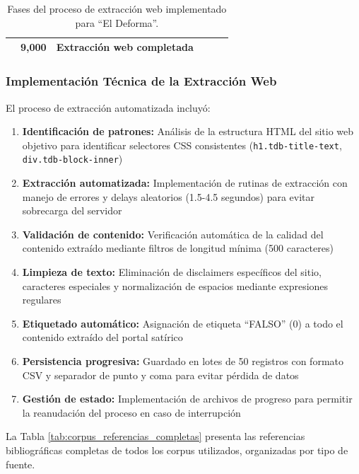 \begin{table}[htbp]
{\begin{tabular}{|c|l|l|c|c|l|}
\hline
\rowcolor{UAMAzcapo!20}
\multicolumn{4}{|c|}{\textbf{TOTAL EXTRAÍDO}} & \textbf{9,000} & \textbf{Extracción web completada} \\
\hline
\end{tabular}
}
\caption{Fases del proceso de extracción web implementado para ``El Deforma''.}
\label{tab:web_scraping_proceso}
\end{table}

\subsubsection{Implementación Técnica de la Extracción Web}

El proceso de extracción automatizada incluyó:

\begin{enumerate}
    \item \textbf{Identificación de patrones:} Análisis de la estructura HTML del sitio web objetivo para identificar selectores CSS consistentes (\texttt{h1.tdb-title-text}, \texttt{div.tdb-block-inner})
    \item \textbf{Extracción automatizada:} Implementación de rutinas de extracción con manejo de errores y delays aleatorios (1.5-4.5 segundos) para evitar sobrecarga del servidor
    \item \textbf{Validación de contenido:} Verificación automática de la calidad del contenido extraído mediante filtros de longitud mínima (500 caracteres)
    \item \textbf{Limpieza de texto:} Eliminación de disclaimers específicos del sitio, caracteres especiales y normalización de espacios mediante expresiones regulares
    \item \textbf{Etiquetado automático:} Asignación de etiqueta ``FALSO'' (0) a todo el contenido extraído del portal satírico
    \item \textbf{Persistencia progresiva:} Guardado en lotes de 50 registros con formato CSV y separador de punto y coma para evitar pérdida de datos
    \item \textbf{Gestión de estado:} Implementación de archivos de progreso para permitir la reanudación del proceso en caso de interrupción
\end{enumerate}

La Tabla \ref{tab:corpus_referencias_completas} presenta las referencias bibliográficas completas de todos los corpus utilizados, organizadas por tipo de fuente.

